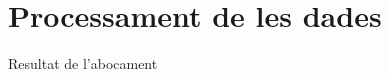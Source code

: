 \section{Processament de les dades}\label{sec:data-processing}

\begin{frame}{Resultat de l'abocament}
    
\end{frame}